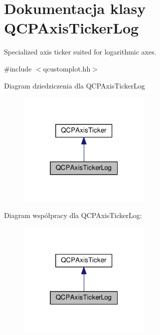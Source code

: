 \hypertarget{class_q_c_p_axis_ticker_log}{}\section{Dokumentacja klasy Q\+C\+P\+Axis\+Ticker\+Log}
\label{class_q_c_p_axis_ticker_log}


Specialized axis ticker suited for logarithmic axes.  




{\ttfamily \#include $<$qcustomplot.\+hh$>$}



Diagram dziedziczenia dla Q\+C\+P\+Axis\+Ticker\+Log\nopagebreak
\begin{figure}[H]
\begin{center}
\leavevmode
\includegraphics[width=181pt]{class_q_c_p_axis_ticker_log__inherit__graph}
\end{center}
\end{figure}


Diagram współpracy dla Q\+C\+P\+Axis\+Ticker\+Log\+:\nopagebreak
\begin{figure}[H]
\begin{center}
\leavevmode
\includegraphics[width=181pt]{class_q_c_p_axis_ticker_log__coll__graph}
\end{center}
\end{figure}
